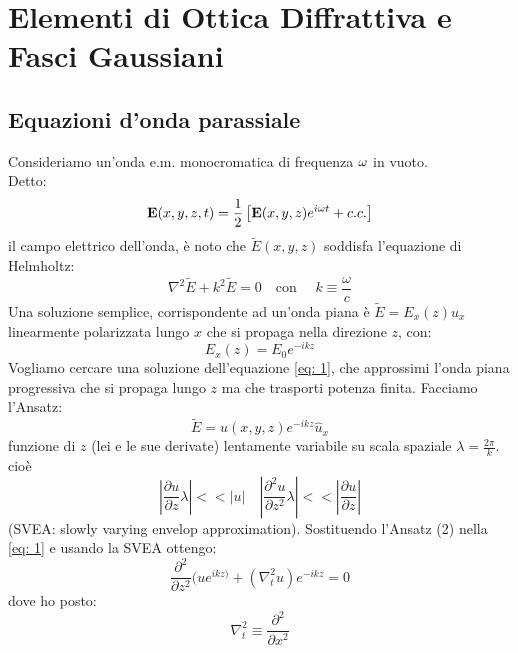 \chapter{Elementi di Ottica Diffrattiva e Fasci Gaussiani}
\graphicspath{{./cap_3/images/}}

\section{Equazioni d'onda parassiale}
Consideriamo un'onda e.m. monocromatica di frequenza $\omega$ in vuoto.\\
Detto:
\begin{equation*}
\mathbf{E}(x,y,z,t) = \frac{1}{2} \left[\mathbf{E}(x,y,z) e^{i\omega t} + c.c.\right]
\end{equation*}
il campo elettrico dell'onda, è noto che $\widetilde{E}(x,y,z)$ soddisfa l'equazione di Helmholtz:
\begin{equation}\label{eq: 1}
\nabla^2 \widetilde{E} + k^2 \widetilde{E} = 0 \quad \text{con } \quad k \equiv \frac{\omega}{c}
\end{equation}
Una soluzione semplice, corrispondente ad un'onda piana è $\widetilde{E} = E_x(z)\hat{u}_x$ linearmente polarizzata lungo $x$ che si propaga nella direzione $z$, con:
\begin{equation*}
E_x(z) = E_0 e^{-ikz}
\end{equation*}
Vogliamo cercare una soluzione dell'equazione \eqref{eq: 1}, che approssimi l'onda piana progressiva che si propaga lungo $z$ ma che trasporti potenza finita. Facciamo l'Ansatz:
\begin{equation*}
\widetilde{E} = u(x,y,z) e^{-i k z} \hat{u}_x
\end{equation*}
funzione di $z$ (lei e le sue derivate) lentamente variabile su scala spaziale $\lambda = \frac{2\pi}{k}$.
cioè
\begin{equation*}
\left| \frac{\partial u}{\partial z} \lambda \right| << |u| \quad \left| \frac{\partial^2 u}{\partial z^2} \lambda \right| << \left|\frac{\partial u}{\partial z}\right|
\end{equation*}
(SVEA: slowly varying envelop approximation). Sostituendo l'Ansatz (2) nella \eqref{eq: 1} e usando la SVEA ottengo:
\begin{equation*}
\frac{\partial^2}{\partial z^2} (u e^{ikz)} + (\nabla_t^2 u) e^{-ikz} = 0
\end{equation*}
dove ho posto:
\begin{equation*}
\nabla_t^2 \equiv \frac{\partial^2}{\partial x^2}
\end{equation*}
